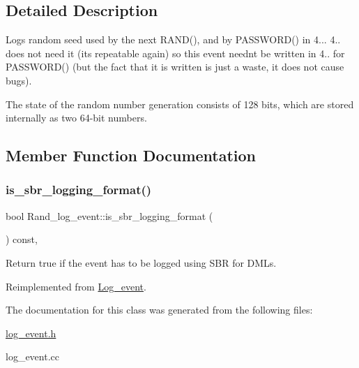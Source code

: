 \subsection{Detailed Description}
Logs random seed used by the next R\+A\+N\+D(), and by P\+A\+S\+S\+W\+O\+R\+D() in 4... 4.. does not need it (it\textquotesingle{}s repeatable again) so this event needn\textquotesingle{}t be written in 4.. for P\+A\+S\+S\+W\+O\+R\+D() (but the fact that it is written is just a waste, it does not cause bugs).

The state of the random number generation consists of 128 bits, which are stored internally as two 64-\/bit numbers. 

\subsection{Member Function Documentation}
\mbox{\label{classRand__log__event_a3b5f698453eb2deee160e5ab771e94b2}} 
\subsubsection{\texorpdfstring{is\+\_\+sbr\+\_\+logging\+\_\+format()}{is\_sbr\_logging\_format()}}
{\footnotesize\ttfamily bool Rand\+\_\+log\+\_\+event\+::is\+\_\+sbr\+\_\+logging\+\_\+format (\begin{DoxyParamCaption}{ }\end{DoxyParamCaption}) const\hspace{0.3cm}{\ttfamily [inline]}, {\ttfamily [virtual]}}

Return true if the event has to be logged using S\+BR for D\+M\+Ls. 

Reimplemented from \mbox{\hyperlink{classLog__event_ad4d689d007b7c8f1b0d54e65d8f34069}{Log\+\_\+event}}.



The documentation for this class was generated from the following files\+:\begin{DoxyCompactItemize}
\item 
\mbox{\hyperlink{log__event_8h}{log\+\_\+event.\+h}}\item 
log\+\_\+event.\+cc\end{DoxyCompactItemize}
